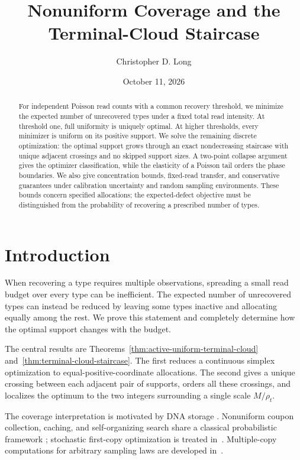 \documentclass[11pt]{article}
\title{Nonuniform Coverage and the\\Terminal-Cloud Staircase}
\author{Christopher D. Long}
\date{October 11, 2026}
\theoremstyle{definition}
\theoremstyle{remark}
\newcommand{\1}{\mathbf 1}
\begin{document}
\maketitle
\begin{abstract}
For independent Poisson read counts with a common recovery threshold, we minimize the expected number of unrecovered types under a fixed total read intensity. At threshold one, full uniformity is uniquely optimal. At higher thresholds, every minimizer is uniform on its positive support. We solve the remaining discrete optimization: the optimal support grows through an exact nondecreasing staircase with unique adjacent crossings and no skipped support sizes. A two-point collapse argument gives the optimizer classification, while the elasticity of a Poisson tail orders the phase boundaries. We also give concentration bounds, fixed-read transfer, and conservative guarantees under calibration uncertainty and random sampling environments. These bounds concern specified allocations; the expected-defect objective must be distinguished from the probability of recovering a prescribed number of types.
\end{abstract}

\section{Introduction}
When recovering a type requires multiple observations, spreading a small
read budget over every type can be inefficient. The expected number of
unrecovered types can instead be reduced by leaving some types inactive
and allocating equally among the rest. We prove this statement and
completely determine how the optimal support changes with the budget.

The central results are Theorems~\ref{thm:active-uniform-terminal-cloud}
and~\ref{thm:terminal-cloud-staircase}. The first reduces a continuous
simplex optimization to equal-positive-coordinate allocations. The
second gives a unique crossing between each adjacent pair of supports,
orders all these crossings, and localizes the optimum to the two
integers surrounding a single scale \(M/\rho_t\).

The coverage interpretation is motivated by DNA storage
\cite{BarLevSabaryGabrysYaakobi2025}. Nonuniform coupon collection,
caching, and self-organizing search share a classical probabilistic
framework \cite{FGT1992}; stochastic first-copy optimization is treated
in~\cite{Anceaume2015}. Multiple-copy computations for arbitrary
sampling laws are developed in~\cite{Abraham2026}.
\end{document}
